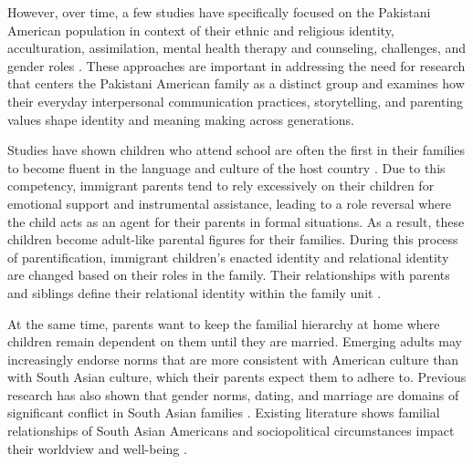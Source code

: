  However, over time, a few studies have specifically focused on the Pakistani American population in context of their ethnic and religious identity, acculturation, assimilation, mental health therapy and counseling, challenges, and gender roles \citep{aghideh2020a, rasoolBangladeshiIndianPakistani2020, bashirUnderstandingContributingFactors2018, chattooYoungPeoplePakistani2004, khalequeDifferentialAcculturationPakistani2015, ghaniPakistaniMigrantsUnited2016, chaudharyTIESTHATBIND2021, thornhillIntersectionalFeministApproach2024}. These approaches are important in addressing the need for research that centers the Pakistani American family as a distinct group and examines how their everyday interpersonal communication practices, storytelling, and parenting values shape identity and meaning making across generations. 
 
Studies have shown children who attend school are often the first in their families to become fluent in the language and culture of the host country \citep{liuIdentityBiculturalMulticultural2017, shinCommunicationTheoryIdentity2017}. Due to this competency, immigrant parents tend to rely excessively on their children for emotional support and instrumental assistance, leading to a role reversal where the child acts as an agent for their parents in formal situations. As a result, these children become adult-like parental figures for their families. During this process of parentification, immigrant children's enacted identity and relational identity are changed based on their roles in the family. Their relationships with parents and siblings define their relational identity within the family unit \citep{attias-donfutIntergenerationalRelationshipsMigrant2017, shinCommunicationTheoryIdentity2017}.

At the same time, parents want to keep the familial hierarchy at home where children remain dependent on them until they are married. Emerging adults may increasingly endorse norms that are more consistent with American culture than with South Asian culture, which their parents expect them to adhere to. Previous research has also shown that gender norms, dating, and marriage are domains of significant conflict in South Asian families \citep{kaliaBufferingParentchildConflict2022, bornsteinImmigrationAcculturationParenting2020, kaliaWhenMisterRight2009}. Existing literature shows familial relationships of South Asian Americans and sociopolitical circumstances impact their worldview and well-being \citep{kaliaBufferingParentchildConflict2022, masoodGenderFamilyCommunity2009}.


